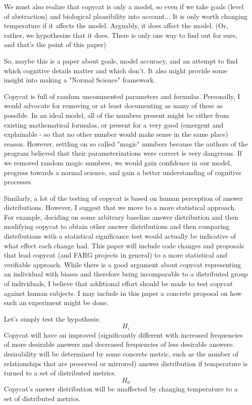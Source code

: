 \documentclass[a4paper]{article}
\begin{document}
We must also realize that copycat is only a model, so even if we take goals (level of abstraction) and biological plausibility into account...
It is only worth changing temperature if it affects the model.
Arguably, it does affect the model. (Or, rather, we hypothesize that it does. There is only one way to find out for sure, and that's the point of this paper)

So, maybe this is a paper about goals, model accuracy, and an attempt to find which cognitive details matter and which don't. It also might provide some insight into making a "Normal Science" framework.

Copycat is full of random uncommented parameters and formulas. Personally, I would advocate for removing or at least documenting as many of these as possible. In an ideal model, all of the numbers present might be either from existing mathematical formulas, or present for a very good (emergent and explainable - so that no other number would make sense in the same place) reason. However, settling on so called "magic" numbers because the authors of the program believed that their parameterizations were correct is very dangerous. If we removed random magic numbers, we would gain confidence in our model, progress towards a normal science, and gain a better understanding of cognitive processes. 

Similarly, a lot of the testing of copycat is based on human perception of answer distributions. However, I suggest that we move to a more statistical approach. For example, deciding on some arbitrary baseline answer distribution and then modifying copycat to obtain other answer distributions and then comparing distributions with a statistical significance test would actually be indicative of what effect each change had. This paper will include code changes and proposals that lead copycat (and FARG projects in general) to a more statistical and verifiable approach.
While there is a good argument about copycat representing an individual with biases and therefore being incomparable to a distributed group of individuals, I believe that additional effort should be made to test copycat against human subjects.  I may include in this paper a concrete proposal on how such an experiment might be done.

Let's simply test the hypothesis: \[H_i\] Copycat will have an improved (significantly different with increased frequencies of more desirable answers and decreased frequencies of less desirable answers: desirability will be determined by some concrete metric, such as the number of relationships that are preserved or mirrored) answer distribution if temperature is turned to a set of distributed metrics. \[H_0\] Copycat's answer distribution will be unaffected by changing temperature to a set of distributed metrics.
\end{document}
